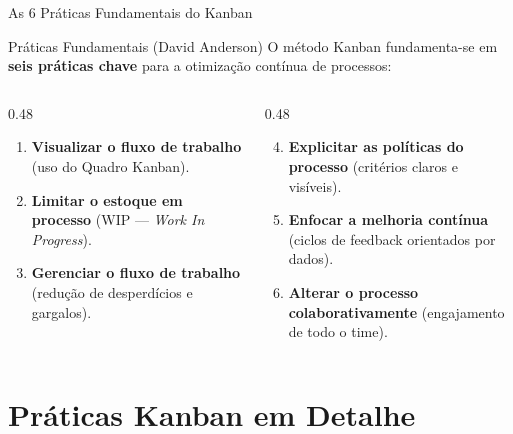 \documentclass[aspectratio=169, 9pt]{beamer}
\begin{document}
\begin{frame}{As 6 Práticas Fundamentais do Kanban}
  \begin{block}{Práticas Fundamentais (David Anderson)}
    O método Kanban fundamenta-se em \textbf{seis práticas chave} para a otimização contínua de processos:
  \end{block}

  \vspace{0.2cm}

  \begin{columns}[T]
    \begin{column}{0.48\textwidth}
      \begin{enumerate}
        \item \textbf{Visualizar o fluxo de trabalho} (uso do Quadro Kanban).
        \item \textbf{Limitar o estoque em processo} (WIP --- \textit{Work In Progress}).
        \item \textbf{Gerenciar o fluxo de trabalho} (redução de desperdícios e gargalos).
      \end{enumerate}
    \end{column}

    \begin{column}{0.48\textwidth}
      \begin{enumerate}
        \setcounter{enumi}{3}
        \item \textbf{Explicitar as políticas do processo} (critérios claros e visíveis).
        \item \textbf{Enfocar a melhoria contínua} (ciclos de feedback orientados por dados).
        \item \textbf{Alterar o processo colaborativamente} (engajamento de todo o time).
      \end{enumerate}
    \end{column}
  \end{columns}
\end{frame}

\section{Práticas Kanban em Detalhe}
\end{document}
